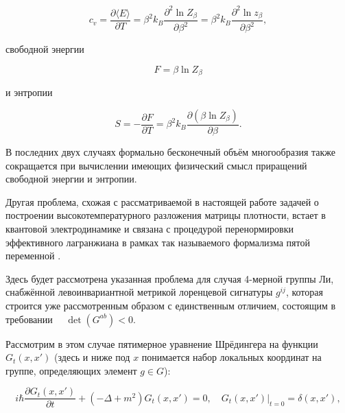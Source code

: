 \begin{equation}

c_v=\frac{\partial \langle E \rangle}{\partial T}=\beta^2 k_{B}\frac{\partial^2 \ln Z_{\beta}}{\partial \beta^2}=\beta^2 k_{B}\frac{\partial^2 \ln z_{\beta}}{\partial \beta^2},

\end{equation}

свободной энергии

\begin{equation}

F=\beta \ln Z_{\beta}

\end{equation}

и энтропии

\begin{equation}

S=-\frac{\partial F}{\partial T}=\beta^2 k_{B}\frac{\partial (\beta \ln Z_{\beta})}{\partial \beta}.

\end{equation}

В последних двух случаях формально бесконечный объём многообразия также сокращается при вычислении имеющих физический смысл приращений свободной энергии и энтропии.



Другая проблема, схожая с рассматриваемой в настоящей работе задачей о построении высокотемпературного разложения матрицы плотности, встает в квантовой электродинамике и связана с процедурой перенормировки эффективного лагранжиана в рамках так называемого формализма пятой переменной \cite{mikh:bib:GMM, mikh:bib:BD}.

Здесь будет рассмотрена указанная проблема для случая 4-мерной группы Ли, снабжённой левоинвариантной метрикой лоренцевой сигнатуры $g^{ij}$, которая строится уже рассмотренным образом с единственным отличием, состоящим в требовании $\quad \det(G^{ab})<0$.



Рассмотрим в этом случае пятимерное уравнение Шрёдингера на функции $G_t(x,x')$ (здесь и ниже под $x$ понимается набор локальных координат на группе, определяющих элемент $g \in G$):

\begin{equation}\label{G_t}

i\hbar\frac{\partial G_{t}(x,x')}{\partial t}+(-\Delta+m^2) G_{t}(x,x') =

0, \quad G_{t}(x,x')|_{t=0}=\delta(x,x'),

\end{equation}

